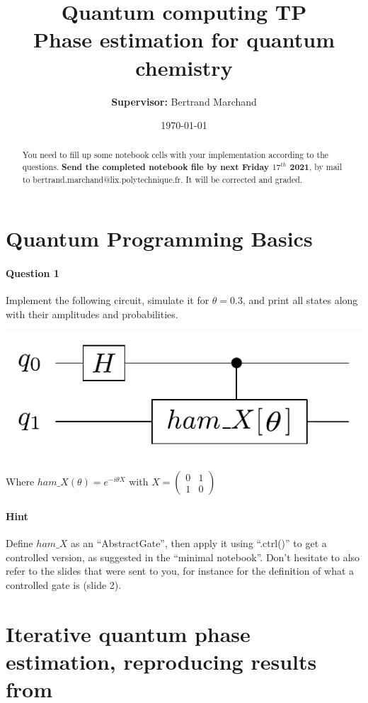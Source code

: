 \documentclass{article}
\title{Quantum computing TP\\ Phase estimation for quantum chemistry}
\author{\textbf{Supervisor:} Bertrand Marchand}
\date{\today}
\begin{document}
\maketitle
\begin{abstract}
You need to fill up some notebook cells with your implementation according to the questions.
    \textbf{Send the completed notebook file by next Friday $17^{th}$ 2021}, by mail to bertrand.marchand@lix.polytechnique.fr. 
It will be corrected and graded.
\end{abstract}

\section{Quantum Programming Basics}

\paragraph{Question 1} Implement the following circuit, simulate it for $\theta=0.3$, and print all states along with their amplitudes and probabilities.

\begin{center}
\includegraphics[width=.7\textwidth]{qat2pdf_llce_fji_circ.pdf}
\end{center}

Where $ham\_X(\theta) = e^{-i\theta X}$ with $X=\begin{pmatrix}0 & 1 \\ 1 & 0\end{pmatrix}$

\paragraph{Hint} Define $ham\_X$ as an ``AbstractGate'', then apply it using ``.ctrl()'' to get a controlled version, as suggested in 
the ``minimal notebook''. Don't hesitate to also refer to the slides that were sent to you, for instance for the definition of what
a controlled gate is (slide 2).

\section{Iterative quantum phase estimation, reproducing results from \textcolor{blue}{\cite{o2016scalable}}}
\end{document}
